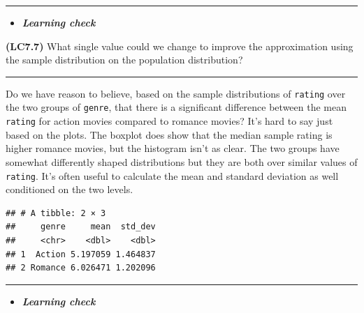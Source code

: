 \documentclass[]{tufte-book}
\newenvironment{Shaded}{\begin{snugshade}}{\end{snugshade}}
\newcommand{\KeywordTok}[1]{\textcolor[rgb]{0.13,0.29,0.53}{\textbf{{#1}}}}
\newcommand{\DataTypeTok}[1]{\textcolor[rgb]{0.13,0.29,0.53}{{#1}}}
\newcommand{\StringTok}[1]{\textcolor[rgb]{0.31,0.60,0.02}{{#1}}}
\newcommand{\NormalTok}[1]{{#1}}
\let\oldrule=\rule
\renewcommand{\rule}[1]{\oldrule{\linewidth}}
\newenvironment{rmdblock}[1]
  {\begin{shaded*}
  \begin{itemize}
  \renewcommand{\labelitemi}{
    \raisebox{-.7\height}[0pt][0pt]{
    }
  }
  \item
  }
  {
  \end{itemize}
  \end{shaded*}
  }
\newenvironment{learncheck}
  {\begin{rmdblock}{warning}}
  {\end{rmdblock}}
\begin{document}
\begin{center}\rule{0.5\linewidth}{\linethickness}\end{center}

\begin{learncheck}
\textbf{\emph{Learning check}}
\end{learncheck}

\textbf{(LC7.7)} What single value could we change to improve the
approximation using the sample distribution on the population
distribution?

\begin{center}\rule{0.5\linewidth}{\linethickness}\end{center}

Do we have reason to believe, based on the sample distributions of
\texttt{rating} over the two groups of \texttt{genre}, that there is a
significant difference between the mean \texttt{rating} for action
movies compared to romance movies? It's hard to say just based on the
plots. The boxplot does show that the median sample rating is higher
romance movies, but the histogram isn't as clear. The two groups have
somewhat differently shaped distributions but they are both over similar
values of \texttt{rating}. It's often useful to calculate the mean and
standard deviation as well conditioned on the two levels.

\begin{Shaded}
\end{Shaded}

\begin{verbatim}
## # A tibble: 2 × 3
##     genre     mean  std_dev
##     <chr>    <dbl>    <dbl>
## 1  Action 5.197059 1.464837
## 2 Romance 6.026471 1.202096
\end{verbatim}

\begin{center}\rule{0.5\linewidth}{\linethickness}\end{center}

\begin{learncheck}
\textbf{\emph{Learning check}}
\end{learncheck}
\end{document}
